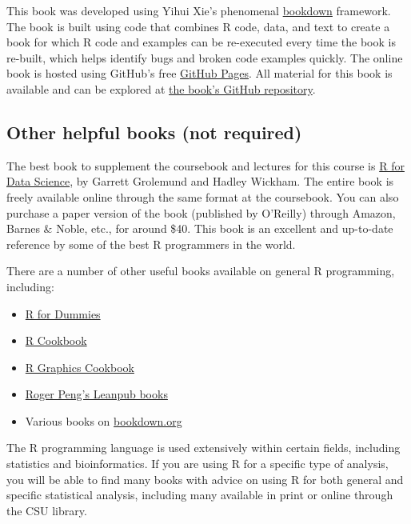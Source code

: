 \documentclass[]{book}
\providecommand{\tightlist}{%
  \setlength{\itemsep}{0pt}\setlength{\parskip}{0pt}}
\begin{document}
This book was developed using Yihui Xie's phenomenal \href{https://bookdown.org}{bookdown} framework. The book is built using code that combines R code, data, and text to create a book for which R code and examples can be re-executed every time the book is re-built, which helps identify bugs and broken code examples quickly. The online book is hosted using GitHub's free \href{https://pages.github.com}{GitHub Pages}. All material for this book is available and can be explored at \href{https://github.com/geanders/RProgrammingForResearch}{the book's GitHub repository}.

\hypertarget{other-helpful-books-not-required}{%
\subsection{Other helpful books (not required)}\label{other-helpful-books-not-required}}

The best book to supplement the coursebook and lectures for this course is \href{http://r4ds.had.co.nz}{R for Data Science}, by Garrett Grolemund and Hadley Wickham. The entire book is freely available online through the same format at the coursebook. You can also purchase a paper version of the book (published by O'Reilly) through Amazon, Barnes \& Noble, etc., for around \$40. This book is an excellent and up-to-date reference by some of the best R programmers in the world.

There are a number of other useful books available on general R programming, including:

\begin{itemize}
\tightlist
\item
  \href{https://colostate-primo.hosted.exlibrisgroup.com/primo-explore/fulldisplay?docid=01COLSU_ALMA51267598310003361\&context=L\&vid=01COLSU\&lang=en_US\&search_scope=Everything\&adaptor=Local\%20Search\%20Engine\&tab=default_tab\&query=any,contains,r\%20for\%20dummies\&sortby=rank\&offset=0}{R for Dummies}
\item
  \href{https://colostate-primo.hosted.exlibrisgroup.com/primo-explore/fulldisplay?docid=01COLSU_ALMA21203304500003361\&context=L\&vid=01COLSU\&lang=en_US\&search_scope=Everything\&adaptor=Local\%20Search\%20Engine\&tab=default_tab\&query=any,contains,r\%20cookbook\&sortby=rank\&offset=0}{R Cookbook}
\item
  \href{http://www.amazon.com/R-Graphics-Cookbook-Winston-Chang/dp/1449316956/ref=sr_1_1?ie=UTF8\&qid=1440997472\&sr=8-1\&keywords=r+graphics+cookbook}{R Graphics Cookbook}
\item
  \href{https://leanpub.com/u/rdpeng}{Roger Peng's Leanpub books}
\item
  Various books on \href{www.bookdown.org}{bookdown.org}
\end{itemize}

The R programming language is used extensively within certain fields, including statistics and bioinformatics. If you are using R for a specific type of analysis, you will be able to find many books with advice on using R for both general and specific statistical analysis, including many available in print or online through the CSU library.


\end{document}
